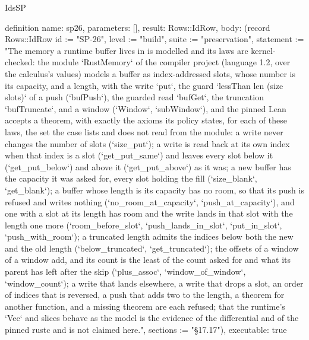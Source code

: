\begin{lexlean}{IdsSP}
\begin{semanticmodule}
definition{
  name: sp26,
  parameters: [],
  result: Rows::IdRow,
  body: (record Rows::IdRow {id := "SP-26", level := "build", suite := "preservation", statement := "The memory a runtime buffer lives in is modelled and its laws are kernel-checked: the module `RustMemory` of the compiler project (language 1.2, over the calculus's values) models a buffer as index-addressed slots, whose number is its capacity, and a length, with the write `put`, the guard `lessThan len (size slots)` of a push (`bufPush`), the guarded read `bufGet`, the truncation `bufTruncate`, and a window (`Window`, `subWindow`), and the pinned Lean accepts a theorem, with exactly the axioms its policy states, for each of these laws, the set the case lists and does not read from the module: a write never changes the number of slots (`size_put`); a write is read back at its own index when that index is a slot (`get_put_same`) and leaves every slot below it (`get_put_below`) and above it (`get_put_above`) as it was; a new buffer has the capacity it was asked for, every slot holding the fill (`size_blank`, `get_blank`); a buffer whose length is its capacity has no room, so that its push is refused and writes nothing (`no_room_at_capacity`, `push_at_capacity`), and one with a slot at its length has room and the write lands in that slot with the length one more (`room_before_slot`, `push_lands_in_slot`, `put_in_slot`, `push_with_room`); a truncated length admits the indices below both the new and the old length (`below_truncated`, `get_truncated`); the offsets of a window of a window add, and its count is the least of the count asked for and what its parent has left after the skip (`plus_assoc`, `window_of_window`, `window_count`); a write that lands elsewhere, a write that drops a slot, an order of indices that is reversed, a push that adds two to the length, a theorem for another function, and a missing theorem are each refused; that the runtime's `Vec` and slices behave as the model is the evidence of the differential and of the pinned rustc and is not claimed here.", sections := "§17.17"}),
  executable: true
}


\end{semanticmodule}
\end{lexlean}
